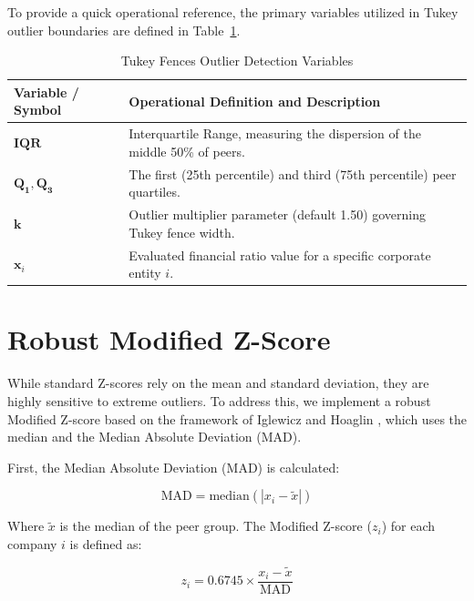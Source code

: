 To provide a quick operational reference, the primary variables utilized in Tukey outlier boundaries are defined in Table~\ref{tab:glossary_tukey}.

\begin{table}[H]
    \centering
    \renewcommand{\arraystretch}{0.85}
    \caption{Tukey Fences Outlier Detection Variables}
    \label{tab:glossary_tukey}
    \footnotesize
    \begin{tabularx}{\textwidth}{lX}
        \toprule
        \textbf{Variable / Symbol} & \textbf{Operational Definition and Description} \\
        \midrule
        $\mathbf{IQR}$ & Interquartile Range, measuring the dispersion of the middle 50\% of peers. \\
        $\mathbf{Q_1}, \mathbf{Q_3}$ & The first (25th percentile) and third (75th percentile) peer quartiles. \\
        $\mathbf{k}$ & Outlier multiplier parameter (default 1.50) governing Tukey fence width. \\
        $\mathbf{x}_i$ & Evaluated financial ratio value for a specific corporate entity $i$. \\
        \bottomrule
    \end{tabularx}
\end{table}

\section{Robust Modified Z-Score}
While standard Z-scores rely on the mean and standard deviation, they are highly sensitive to extreme outliers. To address this, we implement a robust Modified Z-score based on the framework of Iglewicz and Hoaglin \cite{iglewicz1993how}, which uses the median and the Median Absolute Deviation (MAD).

First, the Median Absolute Deviation (MAD) is calculated:

\begin{equation}
    \text{MAD} = \text{median}\left( |x_i - \tilde{x}| \right)
\end{equation}

Where $\tilde{x}$ is the median of the peer group. The Modified Z-score ($z_i$) for each company $i$ is defined as:

\begin{equation}
    z_i = 0.6745 \times \frac{x_i - \tilde{x}}{\text{MAD}}
\end{equation}

